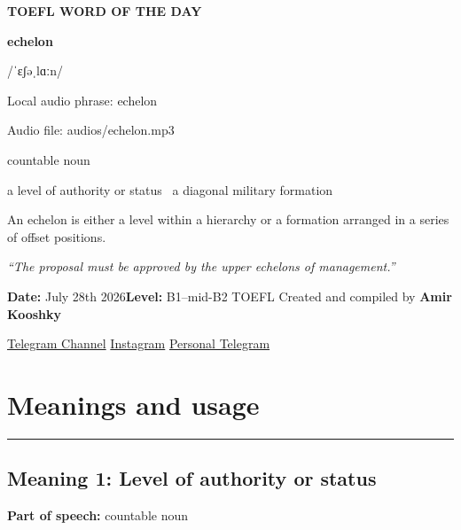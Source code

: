 \documentclass[11pt]{article}
\newcommand{\sectionrule}{\par\vspace{-0.5em}\noindent\textcolor{Accent}{\rule{\linewidth}{0.6pt}}\par}
\begin{document}
\begin{center}
{\sffamily\bfseries\color{Accent} TOEFL WORD OF THE DAY\par}
\vspace{8mm}
{\fontsize{42}{48}\selectfont\bfseries echelon\par}
\vspace{2mm}
{\Large\sffamily\color{Accent} /ˈɛʃəˌlɑːn/\par}
\vspace{2mm}
{\small\sffamily Local audio phrase: echelon\par}
{\small\sffamily Audio file: audios/echelon.mp3\par}
\vspace{2mm}
{\large\sffamily\color{Muted} countable noun\par}
\vspace{5mm}
{\sffamily a level of authority or status \textbullet\ a diagonal military formation\par}
\vspace{6mm}
{\large An echelon is either a level within a hierarchy or a formation arranged in a series of offset positions.\par}
\vspace{6mm}
\begin{minipage}{0.84\textwidth}
\itshape “The proposal must be approved by the upper echelons of management.”
\end{minipage}\par
\vspace{10mm}
\textbf{Date:} July 28th 2026\quad\textbullet\quad \textbf{Level:} B1--mid-B2 TOEFL
\vfill
Created and compiled by \textbf{Amir Kooshky}\par
\vspace{2mm}
\href{https://t.me/KooshkyTOEFL}{Telegram Channel}\quad\textbullet\quad
\href{https://www.instagram.com/kooshkytoefl}{Instagram}\quad\textbullet\quad
\href{https://t.me/KooshkyTOEFL\_pv}{Personal Telegram}
\end{center}
\newpage
\tableofcontents
\newpage

\section{Meanings and usage}
\sectionrule
\subsection{Meaning 1: Level of authority or status}
\textbf{Part of speech:} countable noun
\end{document}
